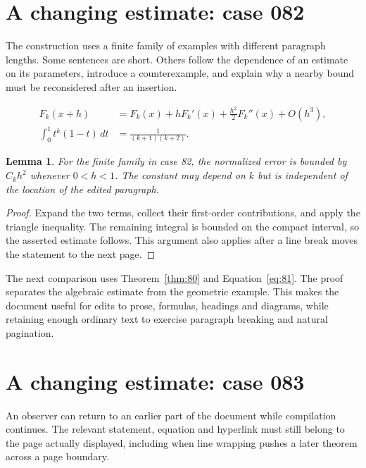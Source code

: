 \documentclass[a4paper,10pt]{article}
\newtheorem{lemma}[theorem]{Lemma}
\begin{document}
\lipsum[3]

\section{A changing estimate: case 082}\label{unit:81}
The construction uses a finite family of examples with different paragraph lengths. Some sentences are short. Others follow the dependence of an estimate on its parameters, introduce a counterexample, and explain why a nearby bound must be reconsidered after an insertion.

\lipsum[4-5]
\begin{align}\label{eq:81}
 F_k(x+h)&=F_k(x)+hF_k'(x)+\frac{h^2}{2}F_k''(x)+O(h^3),\\
 \int_0^1 t^k(1-t)\,dt&=\frac{1}{(k+1)(k+2)}.
\end{align}
\begin{lemma}\label{thm:81}
For the finite family in case 82, the normalized error is bounded by $C_k h^2$ whenever $0<h<1$. The constant may depend on $k$ but is independent of the location of the edited paragraph.
\end{lemma}
\begin{proof}
Expand the two terms, collect their first-order contributions, and apply the
triangle inequality. The remaining integral is bounded on the compact interval,
so the asserted estimate follows. This argument also applies after a line break
moves the statement to the next page.
\end{proof}
\begin{center}
\end{center}
The next comparison uses Theorem~\ref{thm:80} and Equation~\ref{eq:81}. The proof separates the algebraic estimate from the geometric example. This makes the document useful for edits to prose, formulas, headings and diagrams, while retaining enough ordinary text to exercise paragraph breaking and natural pagination.

\lipsum[8]

\section{A changing estimate: case 083}\label{unit:82}
An observer can return to an earlier part of the document while compilation continues. The relevant statement, equation and hyperlink must still belong to the page actually displayed, including when line wrapping pushes a later theorem across a page boundary.
\end{document}
